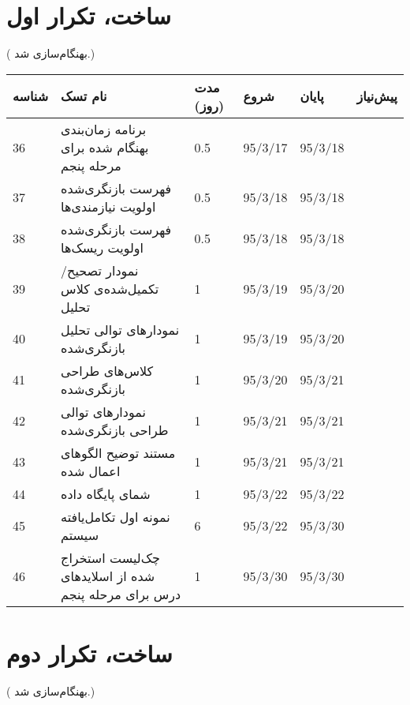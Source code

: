\newpage
\section{ساخت، تکرار اول}
({\color{red} بهنگام‌سازی شد.})

\begin{tabular}[H]{ | l | l | l | l | l | l | }
	\hline
	شناسه & نام تسک & مدت (روز) & شروع & پایان & پیش‌نیاز    \\ \hline
	36 & برنامه زمان‌بندی بهنگام شده برای مرحله پنجم & 0.5   &   95/3/17 &   95/3/18 &  \\ \hline
	37 &  فهرست بازنگری‌شده اولویت نیازمندی‌ها & 0.5   &   95/3/18 &   95/3/18 &  \\ \hline
	38 &  فهرست بازنگری‌شده اولویت ریسک‌ها & 0.5   &   95/3/18 &   95/3/18 &  \\ \hline
	39 & نمودار تصحیح/تکمیل‌شده‌ی کلاس تحلیل & 1   &   95/3/19 &   95/3/20 &  \\ \hline
	40 & نمودارهای توالی تحلیل بازنگری‌شده & 1   &   95/3/19 &   95/3/20 &  \\ \hline
	41 & کلاس‌های طراحی بازنگری‌شده & 1   &   95/3/20 &   95/3/21 &  \\ \hline
	42 & نمودارهای توالی طراحی بازنگری‌شده & 1   &   95/3/21 &   95/3/21 &  \\ \hline
	43 & مستند توضیح الگوهای اعمال شده & 1   &   95/3/21 &   95/3/21 &  \\ \hline
	44 & شمای پایگاه داده & 1   &   95/3/22 &   95/3/22 &  \\ \hline
	45 & نمونه اول تکامل‌یافته سیستم & 6   &   95/3/22 &   95/3/30 &  \\ \hline
	46 & چک‌‌لیست استخراج شده از اسلایدهای درس برای مرحله پنجم & 1   &   95/3/30 &   95/3/30 &  \\ \hline
\end{tabular}

\newpage
\section{ساخت، تکرار دوم}
({\color{red} بهنگام‌سازی شد.})

